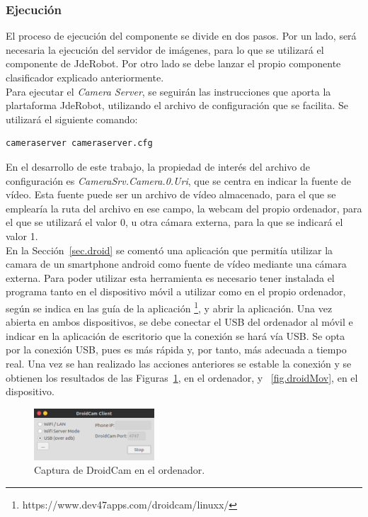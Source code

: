 \subsubsection{Ejecución}
El proceso de ejecución del componente se divide en dos pasos. Por un lado, será necesaria la ejecución del servidor de imágenes, para lo que se utilizará el componente de JdeRobot. Por otro lado se debe lanzar el propio componente clasificador explicado anteriormente.\\

Para ejecutar el \textit{Camera Server}, se seguirán las instrucciones que aporta la plartaforma JdeRobot, utilizando el archivo de configuración que se facilita. Se utilizará el siguiente comando: 
\vspace{10pt}
\begin{lstlisting}[frame=single]
	cameraserver cameraserver.cfg
\end{lstlisting}

En el desarrollo de este trabajo, la propiedad de interés del archivo de configuración es \textit{CameraSrv.Camera.0.Uri}, que se centra en indicar la fuente de vídeo. Esta fuente puede ser un archivo de vídeo almacenado, para el que se emplearía la ruta del archivo en ese campo, la webcam del propio ordenador, para el que se utilizará el valor 0, u otra cámara externa, para la que se indicará el valor 1.\\

En la Sección~\ref{sec.droid} se comentó una aplicación que permitía utilizar la camara de un smartphone android como fuente de vídeo mediante una cámara externa. Para poder utilizar esta herramienta es necesario tener instalada el programa tanto en el dispositivo móvil a utilizar como en el propio ordenador, según se indica en las guía de la aplicación \footnote{https://www.dev47apps.com/droidcam/linuxx/}, y abrir la aplicación. Una vez abierta en ambos dispositivos, se debe conectar el USB del ordenador al móvil e indicar en la aplicación de escritorio que la conexión se hará vía USB. Se opta por la conexión USB, pues es más rápida y, por tanto, más adecuada a tiempo real. Una vez se han realizado las acciones anteriores se estable la conexión y se obtienen los resultados de las Figuras~\ref{fig.droidEsc}, en el ordenador, y ~\ref{fig.droidMov}, en el dispositivo.\\

\begin{figure}[H]
	\begin{center}
		\includegraphics[width=0.4\textwidth]{figures/droidcamEscr}
		\caption{Captura de DroidCam en el ordenador.}
		\label{fig.droidEsc}
	\end{center}
\end{figure}

